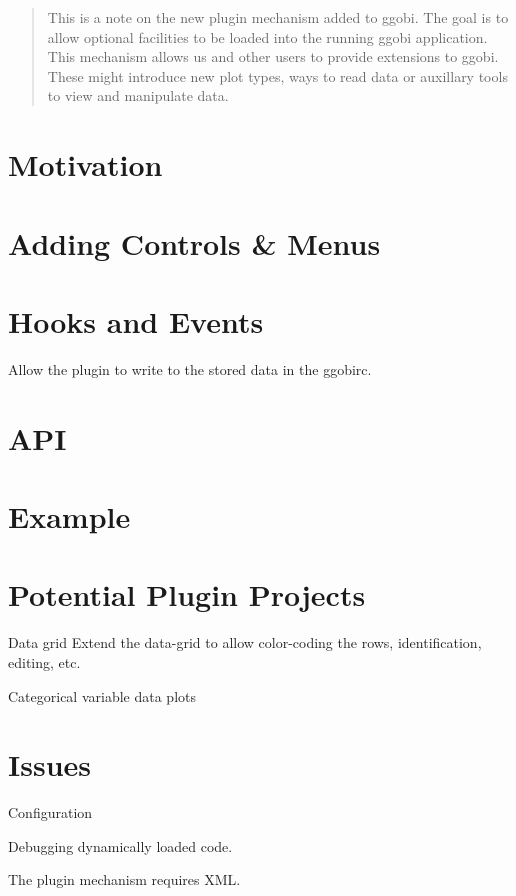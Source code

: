 \documentclass{article}
\begin{document}
\begin{abstract}
  This is a note on the new plugin mechanism added to ggobi. The goal
  is to allow optional facilities to be loaded into the running ggobi
  application.
 This mechanism allows us and other users to provide extensions
 to ggobi. These  might introduce new plot types, ways
 to read data or auxillary tools to view and manipulate
 data.

\end{abstract}

\section{Motivation}

\section{Adding Controls \& Menus}

\section{Hooks and Events}
Allow the plugin to write to the stored data
in the ggobirc.

\section{API}

\section{Example}


\section{Potential Plugin Projects}

\item[Data grid]
Extend the data-grid to 
allow color-coding the rows, identification,
editing, etc.

\item[Categorical variable data plots]




\section{Issues}
Configuration

Debugging dynamically loaded code.

The plugin mechanism requires XML.
\end{document}
